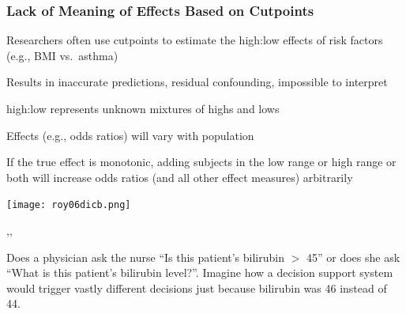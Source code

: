 \subsubsection{Lack of Meaning of Effects Based on Cutpoints}
\bi
\item Researchers often use cutpoints to estimate the high:low effects
  of risk factors (e.g., BMI vs.\ asthma)
\item Results in inaccurate predictions, residual confounding,
  impossible to interpret
\item high:low represents unknown mixtures of highs and lows
\item Effects (e.g., odds ratios) will vary with population
\item If the true effect is monotonic, adding subjects in the low
  range or high range or both will increase odds ratios (and all other
  effect measures) arbitrarily
\ei

\centerline{\texttt{[image: roy06dicb.png]}}
\citet{roy06dic},\citet{nag11ana},\citet{gia14opt}

Does a physician ask the nurse ``Is this patient's bilirubin $>$ 45''
or does she ask ``What is this patient's bilirubin level?''.
Imagine how a decision support system would trigger vastly different
decisions just because bilirubin was 46 instead of 44.

